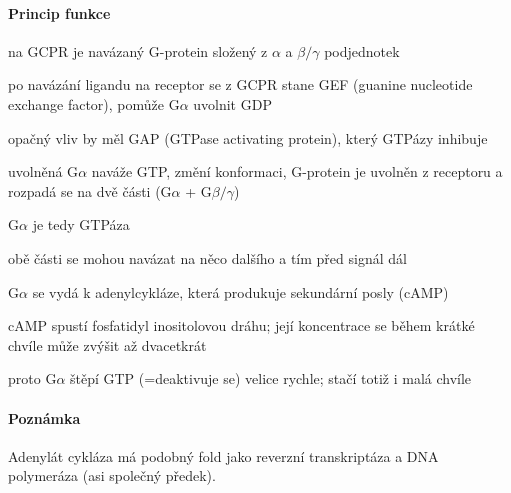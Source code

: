 \documentclass[DIV=8]{scrreprt}
\newcommand{\mybox}[2]{
    \paragraph{#1} #2
}
\begin{document}
\paragraph{Princip funkce}
\begin{myItemize}[nosep]
    \item na GCPR je navázaný G-protein složený z \(\alpha\) a \(\beta / \gamma\) podjednotek
    \item po navázání ligandu na receptor se z GCPR stane GEF (guanine nucleotide exchange factor), pomůže G\(\alpha\) uvolnit GDP
\begin{myItemize}[nosep]
    \item opačný vliv by měl GAP (GTPase activating protein), který GTPázy inhibuje
\end{myItemize}

    \item uvolněná G\(\alpha\) naváže GTP, změní konformaci, G-protein je uvolněn z receptoru a rozpadá se na dvě části (G\(\alpha\) + G\(\beta / \gamma\))
\begin{myItemize}[nosep]
    \item G\(\alpha\) je tedy GTPáza
    \item obě části se mohou navázat na něco dalšího a tím před signál dál
\end{myItemize}

    \item G\(\alpha\) se vydá k adenylcykláze, která produkuje sekundární posly (cAMP)
\begin{myItemize}[nosep]
    \item cAMP spustí fosfatidyl inositolovou dráhu; její koncentrace se během krátké chvíle může zvýšit až dvacetkrát
    \item proto G\(\alpha\) štěpí GTP (=deaktivuje se) velice rychle; stačí totiž i malá chvíle
\end{myItemize}

\end{myItemize}



\mybox{Poznámka}{Adenylát cykláza má podobný fold jako reverzní transkriptáza a DNA polymeráza (asi společný předek).}
\end{document}
